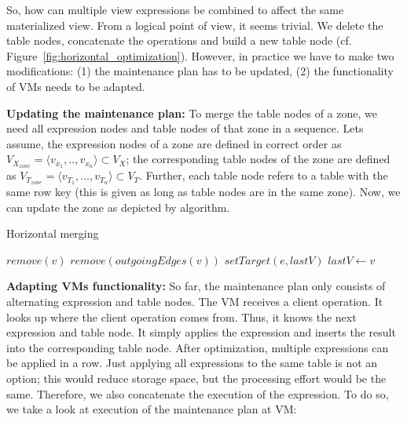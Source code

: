 So, how can multiple view expressions be combined to affect the 
same materialized view. From a logical point of view, it seems trivial. 
We delete the table nodes, concatenate the operations and build a new 
table node (cf. Figure~\ref{fig:horizontal_optimization}). However, in 
practice we have to make two modifications: (1) the maintenance 
plan has to be updated, (2) the functionality of VMs needs to be 
adapted. 



\noindent
\textbf{Updating the maintenance plan:} To merge the table nodes of a 
zone, we need all expression nodes and table nodes of that zone in a 
sequence. Lets assume, the expression nodes of a zone are defined in 
correct order as $V_{X_{zone}}=\langle v_{x_1},..,v_{x_n}\rangle \subset 
V_X$; the corresponding table nodes of the zone are defined as 
$V_{T_{zone}}=\langle v_{T_1},...,v_{T_n}\rangle \subset V_T$. Further, 
each table node refers to a table with the same row key (this is given 
as long as table nodes are in the same zone). Now, we can update the
zone as depicted by algorithm.


\begin{algorithm}
\caption{Horizontal merging}
\label{alg:assignvm}
\begin{algorithmic}[5]
\State $remove(v)$	
\EndFor
{}
\State $remove(outgoingEdges(v))$
\State $setTarget(e, lastV)$
\EndFor
\State $lastV \leftarrow v$
\EndFor
\EndProcedure
\end{algorithmic}
\end{algorithm}


\noindent
\textbf{Adapting VMs functionality:} So far, the maintenance plan only 
consists of alternating expression and table nodes. The VM receives a
client operation. It looks up where the client operation comes from. Thus,
it knows the next expression and table node. It simply applies the 
expression and inserts the result into the corresponding table node.
After optimization, multiple expressions can be applied in a row.
Just applying all expressions to the same table is not an option; this
would reduce storage space, but the processing effort would be the
same. Therefore, we also concatenate the execution of the expression. 
To do so, we take a look at execution of the maintenance plan at VM: 


